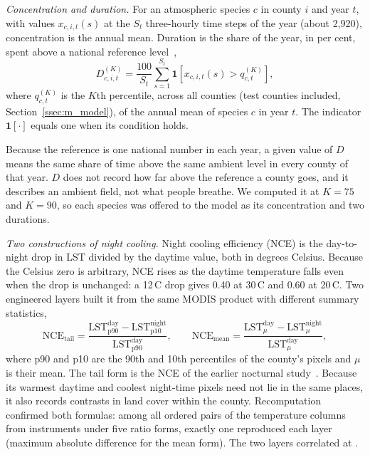 \documentclass[sensors,article,submit,moreauthors,pdftex]{Definitions/mdpi}
\begin{document}
\textit{Concentration and duration.} For an atmospheric species $c$ in county $i$ and year $t$, with values
$x_{c,i,t}(s)$ at the $S_t$ three-hourly time steps of the year (about 2,920), concentration
is the annual mean. Duration is the share of the year, in per cent, spent
above a national reference level~\cite{Shrestha2026exp},
\begin{equation}
D^{(K)}_{c,i,t}
= \frac{100}{S_t}\sum_{s=1}^{S_t}\mathbf{1}\!\left[x_{c,i,t}(s) > q_{c,t}^{(K)}\right],
\label{eq:duration}
\end{equation}
where $q_{c,t}^{(K)}$ is the $K$th percentile, across all counties (test counties
included, Section~\ref{ssec:m_model}), of the
annual mean of species $c$ in year $t$. The indicator $\mathbf{1}[\cdot]$
equals one when its condition holds.

Because the reference is one national number in each year, a given value of $D$
means the same share of time above the same ambient level in every county of
that year. $D$ does not record how far above the reference a county goes, and
it describes an ambient field, not what people breathe. We computed it at $K = 75$ and $K = 90$, so each species was offered to the model as
its concentration and two durations.

\textit{Two constructions of night cooling.} Night cooling efficiency (NCE)
is the day-to-night drop in LST divided by the daytime
value, both in degrees Celsius. Because the Celsius zero is arbitrary, NCE
rises as the daytime temperature falls even when the drop is unchanged: a
12\,\textdegree C drop gives 0.40 at 30\,\textdegree C and 0.60 at
20\,\textdegree C. Two
engineered layers built it from the same MODIS product with different summary
statistics,
\begin{equation}
\text{NCE}_{\text{tail}} = \frac{\text{LST}^{\text{day}}_{\text{p90}}
  - \text{LST}^{\text{night}}_{\text{p10}}}{\text{LST}^{\text{day}}_{\text{p90}}},
\qquad
\text{NCE}_{\text{mean}} = \frac{\text{LST}^{\text{day}}_{\mu}
  - \text{LST}^{\text{night}}_{\mu}}{\text{LST}^{\text{day}}_{\mu}},
\label{eq:nce}
\end{equation}
where p90 and p10 are the 90th and 10th percentiles of the county's
pixels and $\mu$ is their mean. The tail form is the NCE of the earlier
nocturnal study~\cite{Ahmad2026night}. Because its warmest daytime and coolest
night-time pixels need not lie in the same places, it also records contrasts in
land cover within the county. Recomputation confirmed both formulas:
among all ordered pairs of the \NCEcandCols{} temperature columns from
\NCEcandSrc{} instruments under five ratio forms, exactly one reproduced each
layer (maximum absolute difference \NCEmaxdiffMean{} for the mean form). The
two layers correlated at \NCEcorr{}.
\end{document}
